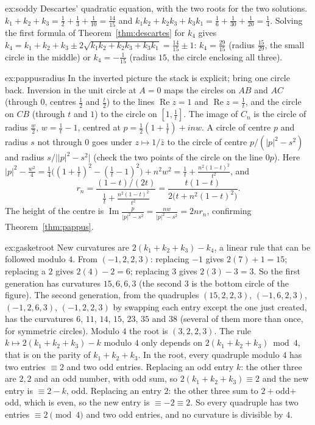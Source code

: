 \begin{solution}{ex:soddy}
\idea Descartes' quadratic equation, with the two roots for the two solutions.
\writeup $k_1+k_2+k_3=\frac12+\frac13+\frac1{10}=\frac{14}{15}$ and $k_1k_2+k_2k_3+k_3k_1=\frac16+\frac1{30}+\frac1{20}=\frac14$. Solving the first formula of
Theorem~\ref{thm:descartes} for $k_4$ gives $k_4=k_1+k_2+k_3\pm2\sqrt{k_1k_2+k_2k_3+k_3k_1}=\frac{14}{15}\pm1$: $k_4=\frac{29}{15}$ (radius
$\frac{15}{29}$, the small circle in the middle) or $k_4=-\frac1{15}$ (radius $15$, the circle enclosing all three).
\end{solution}

\begin{solution}{ex:pappusradius}
\idea In the inverted picture the stack is explicit; bring one circle back.
\writeup Inversion in the unit circle at $A=0$ maps the circles on $AB$ and $AC$ (through $0$, centres $\frac12$ and $\frac t2$) to the lines
$\operatorname{Re}z=1$ and $\operatorname{Re}z=\frac1t$, and the circle on $CB$ (through $t$ and $1$) to the circle on $[1,\frac1t]$. The image of $C_n$ is the
circle of radius $\frac w2$, $w=\frac1t-1$, centred at $p=\frac12(1+\frac1t)+inw$. A circle of centre $p$ and radius $s$ not through $0$ goes under
$z\mapsto1/\bar z$ to the circle of centre $p/(|p|^2-s^2)$ and radius $s/\bigl||p|^2-s^2\bigr|$ (check the two points of the circle on the line $0p$).
Here $|p|^2-\frac{w^2}4=\frac14\bigl((1+\frac1t)^2-(\frac1t-1)^2\bigr)+n^2w^2=\frac1t+\frac{n^2(1-t)^2}{t^2}$, and
\[
r_n=\frac{(1-t)/(2t)}{\frac1t+\frac{n^2(1-t)^2}{t^2}}=\frac{t(1-t)}{2\bigl(t+n^2(1-t)^2\bigr)} .
\]
The height of the centre is $\operatorname{Im}\frac p{|p|^2-s^2}=\frac{nw}{|p|^2-s^2}=2nr_n$, confirming Theorem~\ref{thm:pappus}.
\end{solution}

\begin{solution}{ex:gasketroot}
\idea New curvatures are $2(k_1+k_2+k_3)-k_4$, a linear rule that can be followed modulo $4$.
\writeup From $(-1,2,2,3)$: replacing $-1$ gives $2(7)+1=15$; replacing a $2$ gives $2(4)-2=6$; replacing $3$ gives $2(3)-3=3$. So the first
generation has curvatures $15,6,6,3$ (the second $3$ is the bottom circle of the figure). The second generation, from the quadruples
$(15,2,2,3)$, $(-1,6,2,3)$, $(-1,2,6,3)$, $(-1,2,2,3)$ by swapping each entry except the one just created, has the
curvatures $6$, $11$, $14$, $15$, $23$, $35$ and $38$ (several of them more than once, for symmetric circles). Modulo $4$ the root is $(3,2,2,3)$. The
rule $k\mapsto2(k_1+k_2+k_3)-k$ modulo $4$ only depends on $2(k_1+k_2+k_3)\bmod4$, that is on the parity of $k_1+k_2+k_3$. In the root, every
quadruple modulo $4$ has two entries $\equiv2$ and two odd entries. Replacing an odd entry $k$: the other three are $2,2$ and an odd number, with odd
sum, so $2(k_1+k_2+k_3)\equiv2$ and the new entry is $\equiv2-k$, odd. Replacing an entry $2$: the other three sum to $2+$odd$+$odd, which is
even, so the new entry is $\equiv-2\equiv2$. So every
quadruple has two entries $\equiv2\pmod 4$ and two odd entries, and no curvature is divisible by $4$.
\end{solution}

